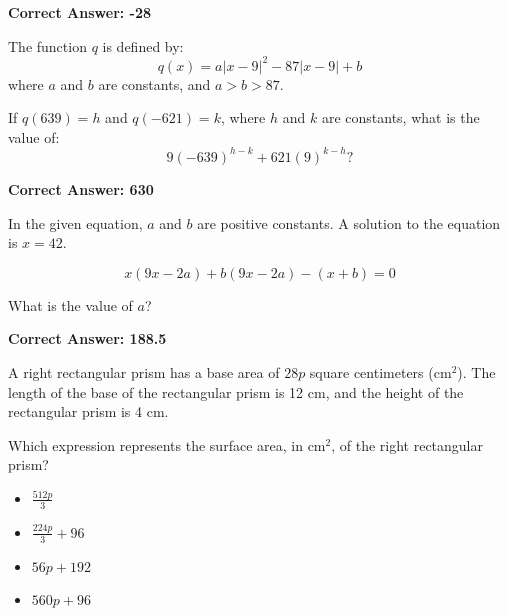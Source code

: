 \documentclass{article}
\begin{document}
\begin{tcolorbox}[colback=green!10, colframe=green!50!black,title=Answer to Question 5]
\textbf{Correct Answer: -28}  
\end{tcolorbox}

\vspace{20pt}

\begin{tcolorbox}[colback=blue!5!white,colframe=blue!75!black,title=Question 6]
The function \( q \) is defined by:
\[
q(x) = a |x - 9|^2 - 87 |x - 9| + b
\]
where \( a \) and \( b \) are constants, and \( a > b > 87 \).

If \( q(639) = h \) and \( q(-621) = k \), where \( h \) and \( k \) are constants, what is the value of:
\[
9(-639)^{h-k} + 621(9)^{k-h}?
\]
\end{tcolorbox}

\begin{tcolorbox}[colback=green!10, colframe=green!50!black,title=Answer to Question 6]
\textbf{Correct Answer: 630}  
\end{tcolorbox}

\vspace{20pt}

\begin{tcolorbox}[colback=blue!5!white,colframe=blue!75!black,title=Question 7]
In the given equation, \( a \) and \( b \) are positive constants. A solution to the equation is \( x = 42 \).

\[
x(9x - 2a) + b(9x - 2a) - (x + b) = 0
\]

What is the value of \( a \)?
\end{tcolorbox}

\begin{tcolorbox}[colback=green!10, colframe=green!50!black,title=Answer to Question 7]
\textbf{Correct Answer: 188.5 }  
\end{tcolorbox}

\vspace{20pt}

\begin{tcolorbox}[colback=blue!5!white,colframe=blue!75!black,title=Question 8]
A right rectangular prism has a base area of \( 28p \) square centimeters (\(\text{cm}^2\)). The length of the base of the rectangular prism is 12 cm, and the height of the rectangular prism is 4 cm.

Which expression represents the surface area, in \(\text{cm}^2\), of the right rectangular prism?

\begin{itemize}
    \item[A.] \( \frac{512p}{3} \)
    \item[B.] \( \frac{224p}{3} + 96 \)
    \item[C.] \( 56p + 192 \)
    \item[D.] \( 560p + 96 \)
\end{itemize}
\end{tcolorbox}
\end{document}
